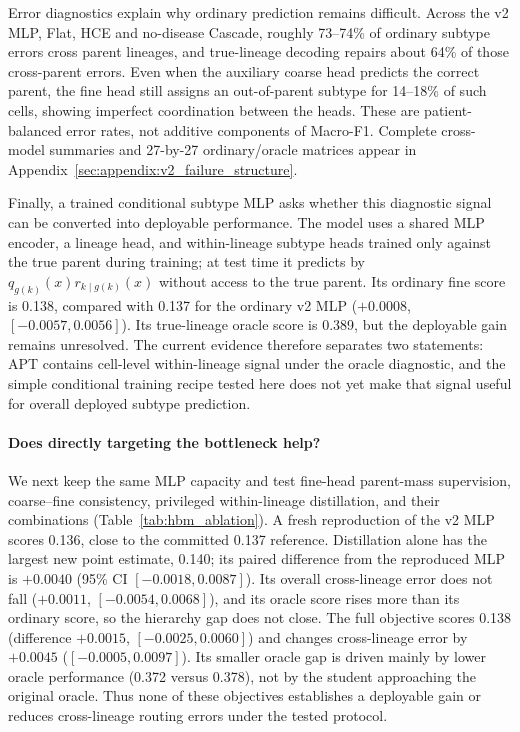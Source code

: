 Error diagnostics explain why ordinary prediction remains difficult. Across
the v2 MLP, Flat, HCE and no-disease Cascade, roughly 73--74\% of ordinary
subtype errors cross parent lineages, and true-lineage decoding repairs about
64\% of those cross-parent errors. Even when the auxiliary coarse head predicts
the correct parent, the fine head still assigns an out-of-parent subtype for
14--18\% of such cells, showing imperfect coordination between the heads.
These are patient-balanced error rates, not additive components of Macro-F1.
Complete cross-model summaries and 27-by-27 ordinary/oracle matrices appear in
Appendix~\ref{sec:appendix:v2_failure_structure}.

Finally, a trained conditional subtype MLP asks whether this diagnostic signal
can be converted into deployable performance. The model uses a shared MLP
encoder, a lineage head, and within-lineage subtype heads trained only against
the true parent during training; at test time it predicts by
$q_{g(k)}(x)r_{k\mid g(k)}(x)$ without access to the true parent. Its ordinary
fine score is 0.138, compared with 0.137 for the ordinary v2 MLP
($+0.0008$, $[-0.0057,0.0056]$). Its true-lineage oracle score is 0.389,
but the deployable gain remains unresolved. The current evidence therefore
separates two statements: APT contains cell-level within-lineage signal under
the oracle diagnostic, and the simple conditional training recipe tested here
does not yet make that signal useful for overall deployed subtype prediction.

\paragraph{Does directly targeting the bottleneck help?}
We next keep the same MLP capacity and test fine-head parent-mass supervision,
coarse--fine consistency, privileged within-lineage distillation, and their
combinations (Table~\ref{tab:hbm_ablation}). A fresh reproduction of the v2 MLP
scores 0.136, close to the committed 0.137 reference. Distillation alone has
the largest new point estimate, 0.140; its paired difference from the reproduced
MLP is $+0.0040$ (95\% CI $[-0.0018,0.0087]$). Its overall cross-lineage error
does not fall ($+0.0011$, $[-0.0054,0.0068]$), and its oracle score rises more
than its ordinary score, so the hierarchy gap does not close. The full objective
scores 0.138 (difference $+0.0015$, $[-0.0025,0.0060]$) and changes cross-lineage
error by $+0.0045$ ($[-0.0005,0.0097]$). Its smaller oracle gap is driven mainly
by lower oracle performance (0.372 versus 0.378), not by the student approaching
the original oracle. Thus none of these objectives establishes a deployable
gain or reduces cross-lineage routing errors under the tested protocol.


